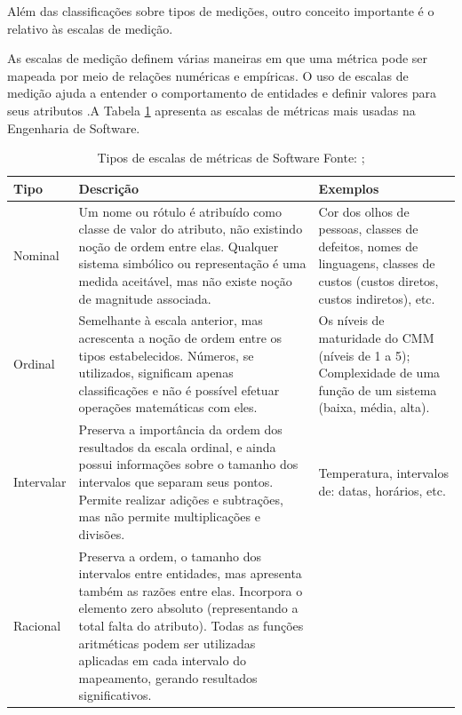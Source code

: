 Além das classificações sobre tipos de medições, outro conceito importante é o relativo às escalas de medição.
 	
As escalas de medição definem várias maneiras em que uma métrica pode ser mapeada por meio de relações numéricas e empíricas. O uso de escalas de medição ajuda a entender o comportamento de entidades e definir valores para seus atributos \cite[pp~45-46]{Fenton}.A Tabela \ref{tipos_metricas2} apresenta as escalas de métricas mais usadas na Engenharia de Software.

\clearpage
	\begin{longtable}{|p{70pt}|p{220pt}|p{135pt}|}

 	\caption {Tipos de escalas de métricas de Software Fonte: \cite[p. 9]{park}; \cite [pp. ~45-53]{Fenton}} \label{tipos_metricas2}\\
 	\hline
 	 {\raggedright \textbf{Tipo}}
 	 & {\raggedright \textbf{Descrição}}
 	 & {\raggedright \textbf{Exemplos}}\\
 	\hline
 	 {\raggedright Nominal}
 	 & {\raggedright Um nome ou rótulo é atribuído como classe de valor do atributo, não existindo noção de ordem entre elas. Qualquer sistema simbólico ou representação é uma medida aceitável, mas não existe noção de magnitude associada.}
 	 & {\raggedright Cor dos olhos de pessoas, classes de defeitos, nomes de linguagens, classes de custos (custos diretos, custos indiretos), etc.}\\
 	\hline
 	 {\raggedright Ordinal}
 	 & {\raggedright Semelhante à escala anterior, mas acrescenta a noção de ordem entre os tipos estabelecidos. Números, se utilizados, significam apenas classificações e não é possível efetuar operações matemáticas com eles.}
 	 & {\raggedright Os níveis de maturidade do CMM 
 	 (níveis de 1 a 5);
 	 Complexidade de uma função de um sistema (baixa, média, alta).
 	 }\\
 	\hline
 	 {\raggedright Intervalar} 
 	 & {\raggedright Preserva a importância da ordem dos resultados da escala ordinal, e ainda possui informações sobre o tamanho dos intervalos que separam seus pontos. Permite realizar adições e subtrações, mas não permite multiplicações e divisões.}
& {\raggedright Temperatura, intervalos de: datas, horários, etc.}\\
 	\hline
 	 {\raggedright Racional}
 	 & {\raggedright Preserva a ordem, o tamanho dos intervalos entre entidades, mas apresenta também as razões entre elas.
 	 Incorpora o elemento zero absoluto (representando a total falta do atributo). Todas as funções aritméticas podem ser utilizadas aplicadas em cada intervalo do mapeamento, gerando resultados significativos.
}
\end{longtable}
